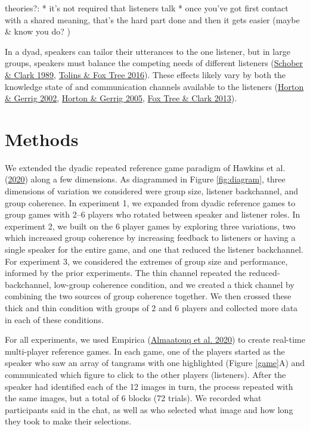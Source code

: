 \documentclass[
  english,
  a4paper,
]{article}
\begin{document}
theories?:
* it's not required that listeners talk
* once you've got first contact with a shared meaning, that's the hard part done and then it gets easier (maybe \& know you do? )

In a dyad, speakers can tailor their utterances to the one listener, but in large groups, speakers must balance the competing needs of different listeners (\protect\hyperlink{ref-schober1989}{Schober \& Clark 1989}, \protect\hyperlink{ref-tolins2016}{Tolins \& Fox Tree 2016}). These effects likely vary by both the knowledge state of and communication channels available to the listeners (\protect\hyperlink{ref-horton2002}{Horton \& Gerrig 2002}, \protect\hyperlink{ref-horton2005}{Horton \& Gerrig 2005}, \protect\hyperlink{ref-fox-tree2013}{Fox Tree \& Clark 2013}).

\hypertarget{methods}{%
\section{Methods}\label{methods}}

We extended the dyadic repeated reference game paradigm of Hawkins et al. (\protect\hyperlink{ref-hawkinsCharacterizingDynamicsLearning2020}{2020}) along a few dimensions. As diagrammed in Figure \ref{fig:diagram}, three dimensions of variation we considered were group size, listener backchannel, and group coherence. In experiment 1, we expanded from dyadic reference games to group games with 2--6 players who rotated between speaker and listener roles. In experiment 2, we built on the 6 player games by exploring three variations, two which increased group coherence by increasing feedback to listeners or having a single speaker for the entire game, and one that reduced the listener backchannel. For experiment 3, we considered the extremes of group size and performance, informed by the prior experiments. The thin channel repeated the reduced-backchannel, low-group coherence condition, and we created a thick channel by combining the two sources of group coherence together. We then crossed these thick and thin condition with groups of 2 and 6 players and collected more data in each of these conditions.

For all experiments, we used Empirica (\protect\hyperlink{ref-almaatouqEmpiricaVirtualLab2020}{Almaatouq et al. 2020}) to create real-time multi-player reference games. In each game, one of the players started as the speaker who saw an array of tangrams with one highlighted (Figure \ref{game}A) and communicated which figure to click to the other players (listeners). After the speaker had identified each of the 12 images in turn, the process repeated with the same images, but a total of 6 blocks (72 trials). We recorded what participants said in the chat, as well as who selected what image and how long they took to make their selections.
\end{document}
